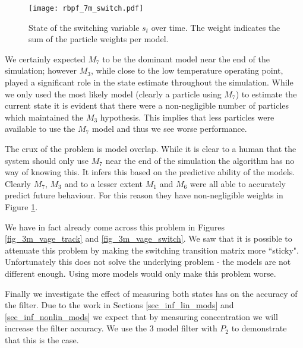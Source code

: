 \begin{figure}[H] 
\centering
\texttt{[image: rbpf\_7m\_switch.pdf]}
\caption{State of the switching variable $s_t$ over time. The weight indicates the sum of the particle weights per model.}
\label{fig_7m_switch}
\end{figure}
We certainly expected $M_7$ to be the dominant model near the end of the simulation; however $M_3$, while close to the low temperature operating point, played a significant role in the state estimate throughout the simulation. While we only used the most likely model (clearly a particle using $M_7$) to estimate the current state it is evident that there were a non-negligible number of particles which maintained the $M_3$ hypothesis. This implies that less particles were available to use the $M_7$ model and thus we see worse performance.

The crux of the problem is model overlap. While it is clear to a human that the system should only use $M_7$ near the end of the simulation the algorithm has no way of knowing this. It infers this based on the predictive ability of the models. Clearly $M_7$, $M_3$ and to a lesser extent $M_1$ and $M_6$ were all able to accurately predict future behaviour. For this reason they have non-negligible weights in Figure \ref{fig_7m_switch}. 

We have in fact already come across this problem in Figures \ref{fig_3m_vage_track} and \ref{fig_3m_vage_switch}. We saw that it is possible to attenuate this problem by making the switching transition matrix more ``sticky". Unfortunately this does not solve the underlying problem - the models are not different enough. Using more models would only make this problem worse.

Finally we investigate the effect of measuring both states has on the accuracy of the filter. Due to the work in Sections \ref{sec_inf_lin_mods} and \ref{sec_inf_nonlin_mods} we expect that by measuring concentration we will increase the filter accuracy. We use the 3 model filter with $P_2$ to demonstrate that this is the case.

